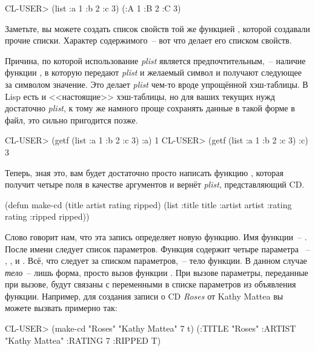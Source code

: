 \begin{myverb}
  CL-USER> (list :a 1 :b 2 :c 3)
  (:A 1 :B 2 :C 3)
\end{myverb}

Заметьте, вы можете создать список свойств той же функцией , которой создавали
прочие списки. Характер содержимого~-- вот что делает его списком свойств.

Причина, по которой использование \textit{plist} является предпочтительным,~-- наличие
функции , в которую передают \textit{plist} и желаемый символ и получают
следующее за символом значение. Это делает \textit{plist} чем-то вроде упрощённой
хэш-таблицы. В Lisp есть и <<настоящие>> хэш-таблицы, но для ваших текущих нужд достаточно
\textit{plist}, к тому же намного проще сохранять данные в такой форме в файл, это сильно
пригодится позже.

\begin{myverb}
  CL-USER> (getf (list :a 1 :b 2 :c 3) :a)
  1
  CL-USER> (getf (list :a 1 :b 2 :c 3) :c)
  3
\end{myverb}

Теперь, зная это, вам будет достаточно просто написать функцию , которая
получит четыре поля в качестве аргументов и вернёт \textit{plist}, представляющий CD.

\begin{myverb}
(defun make-cd (title artist rating ripped)
  (list :title title :artist artist :rating rating :ripped ripped))
\end{myverb}

Слово  говорит нам,
что эта запись определяет новую функцию. Имя функции~--
. После имени следует список параметров. Функция содержит четыре параметра
~-- , ,  и . Всё, что следует за
списком параметров,~-- тело функции. В данном случае \textit{тело}~-- лишь форма, просто
вызов функции . При вызове  параметры, переданные при вызове,
будут связаны с переменными в списке параметров из объявления функции. Например, для
создания записи о CD \textit{Roses} от Kathy Mattea вы можете вызвать 
примерно так:

\begin{myverb}
   CL-USER> (make-cd "Roses" "Kathy Mattea" 7 t)
   (:TITLE "Roses" :ARTIST "Kathy Mattea" :RATING 7 :RIPPED T) 
\end{myverb}

